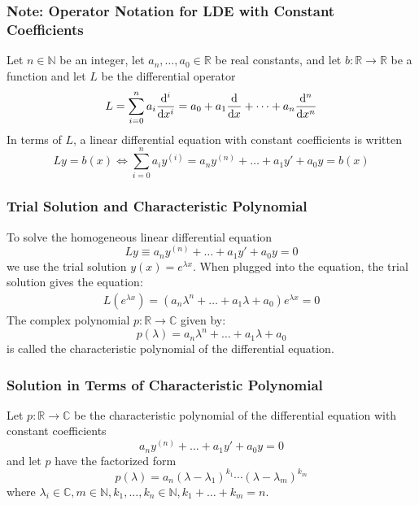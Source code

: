 \documentclass[11pt, a4paper]{article}
\newcommand{\R}{\mathbb{R}} %
\begin{document}
\subsubsection{Note: Operator Notation for LDE with Constant Coefficients}
Let $ n \in \mathbb{N} $ be an integer, let $ a_n, \dots, a_0 \in \R $ be real constants, and let $ b : \R \to \R $ be a function and let $ L $ be the differential operator
\begin{equation*}
	L = \sum_{i=0}^{n} a_i \dv[i]{}{x} = a_0 + a_1\dv{}{x} + \dots + a_n \dv[n]{}{x}
\end{equation*}
In terms of $ L $, a linear differential equation with constant coefficients is written
\begin{equation*}
	L y = b(x) \iff \sum_{i=0}^{n} a_i y^{(i)} = a_n y^{(n)} + \dots + a_1 y' + a_0 y = b(x)
\end{equation*}

\subsubsection{Trial Solution and Characteristic Polynomial}
To solve the homogeneous linear differential equation
\begin{equation*}
	Ly \equiv a_n y^{(n)} + \dots + a_1 y' + a_0 y = 0
\end{equation*}
we use the trial solution $ y(x) = e^{\lambda x} $. When plugged into the equation, the trial solution gives the equation:
\begin{align*}
	L (e^{\lambda x}) = (a_n \lambda^n + \dots + a_1 \lambda + a_0) e^{\lambda x} = 0
\end{align*}
The complex polynomial $ p : \R \to \mathbb{C} $ given by:
\begin{equation*}
	p(\lambda) = a_n \lambda^n + \dots + a_1 \lambda + a_0
\end{equation*}
is called the characteristic polynomial of the differential equation.

\subsubsection{Solution in Terms of Characteristic Polynomial}
Let $ p : \R \to \mathbb{C} $ be the characteristic polynomial of the differential equation with constant coefficients
\begin{equation*}
	a_n y^{(n)} + \dots + a_1 y' + a_0 y = 0
\end{equation*}
and let $ p $ have the factorized form
\begin{equation*}
	p(\lambda ) = a_n(\lambda - \lambda_1)^{k_1} \cdots (\lambda - \lambda_m)^{k_m}
\end{equation*}
where $ \lambda_i \in \mathbb{C}, m \in \mathbb{N}, k_1, \dots, k_n \in \mathbb{N}, k_1 + \dots + k_m = n $.
	
\end{document}
